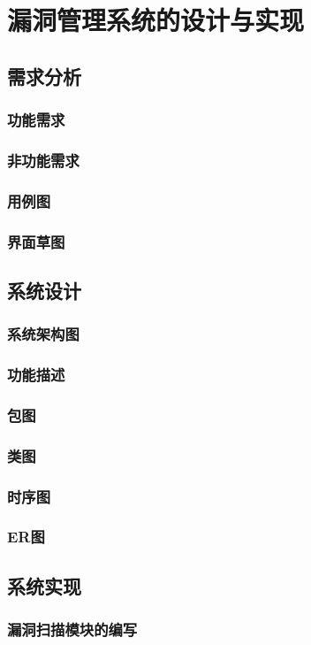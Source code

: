 \documentclass[a4paper]{ctexrep}
\begin{document}
	\chapter{漏洞管理系统的设计与实现}
		\section{需求分析}
			\subsection{功能需求}
			\subsection{非功能需求}
			\subsection{用例图}
			\subsection{界面草图}
		\section{系统设计}
			\subsection{系统架构图}
			\subsection{功能描述}
			\subsection{包图}
			\subsection{类图}
			\subsection{时序图}
			\subsection{ER图}
		\section{系统实现}
			\subsection{漏洞扫描模块的编写}
\end{document}

